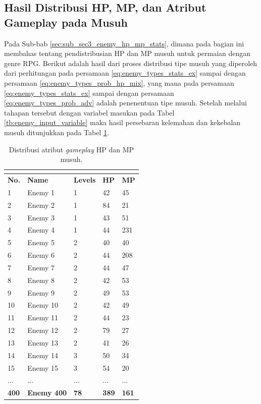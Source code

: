 \subsection{Hasil Distribusi HP, MP, dan Atribut Gameplay pada Musuh}
\label{sec:sub_sec4_eval_dist_enemy_HP_MP_Stats}
\vspace{1ex}

Pada Sub-bab \ref{sec:sub_sec3_enemy_hp_mp_stats}, dimana pada bagian ini membahas tentang pendistribusian HP dan MP musuh untuk permaian dengan genre RPG. Berikut adalah hasil dari proses distribusi tipe musuh yang diperoleh dari perhitungan pada persamaan \ref{eq:enemy_types_stats_ex} sampai dengan persamaan \ref{eq:enemy_types_prob_hp_mix}, yang mana pada persamaan \ref{eq:enemy_types_stats_ex} sampai dengan persamaan \ref{eq:enemy_types_prob_adv} adalah penenentuan tipe musuh. Setelah melalui tahapan tersebut dengan variabel masukan pada Tabel \ref{tb:enemy_input_variable} maka hasil persebaran kelemahan dan kekebalan musuh ditunjukkan pada Tabel \ref{tb:enemy_hp_mp_distrib}.
\vspace{-1ex}

\begin{longtable}{|l|l|l|l|l|}
	\caption{Distribusi atribut \textit{gameplay} HP dan MP musuh.}
	\vspace{1ex}
	\label{tb:enemy_hp_mp_distrib}\\
	\hline
	\rowcolor[HTML]{C0C0C0} 
	\textbf{No.} & \textbf{Name} & \textbf{Levels} & \textbf{HP} & \textbf{MP} \\ \hline
	1 & Enemy 1 & 1 & 42 & 45 \\ \hline
	2 & Enemy 2 & 1 & 84 & 21 \\ \hline
	3 & Enemy 3 & 1 & 43 & 51 \\ \hline
	4 & Enemy 4 & 1 & 44 & 231 \\ \hline
	5 & Enemy 5 & 2 & 40 & 40 \\ \hline
	6 & Enemy 6 & 2 & 44 & 208 \\ \hline
	7 & Enemy 7 & 2 & 44 & 47 \\ \hline
	8 & Enemy 8 & 2 & 42 & 53 \\ \hline
	9 & Enemy 9 & 2 & 49 & 53 \\ \hline
	10 & Enemy 10 & 2 & 42 & 49 \\ \hline
	11 & Enemy 11 & 2 & 44 & 23 \\ \hline
	12 & Enemy 12 & 2 & 79 & 27 \\ \hline
	13 & Enemy 13 & 2 & 41 & 26 \\ \hline
	14 & Enemy 14 & 3 & 50 & 34 \\ \hline
	15 & Enemy 15 & 3 & 54 & 20 \\ \hline
	... & ... & ... & ... & ... \\ \hline
	\textbf{400} & \textbf{Enemy 400} & \textbf{78} & \textbf{389} & \textbf{161} \\ \hline
\end{longtable}
\vspace{1ex}

